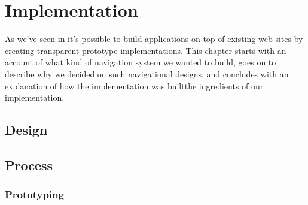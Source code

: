 \chapter{Implementation}
\label{chapter:implementation}


As we've seen in 
it's possible to build applications on top of existing web sites by creating
transparent prototype implementations. This chapter starts with an account of
what kind of navigation system we wanted to build, goes on to describe why we
decided on such navigational designs, and concludes with an explanation of how
the implementation was built\dash{}the ingredients of our implementation.

\section{Design}

%
%
%

\section{Process}

\subsection{Prototyping}

